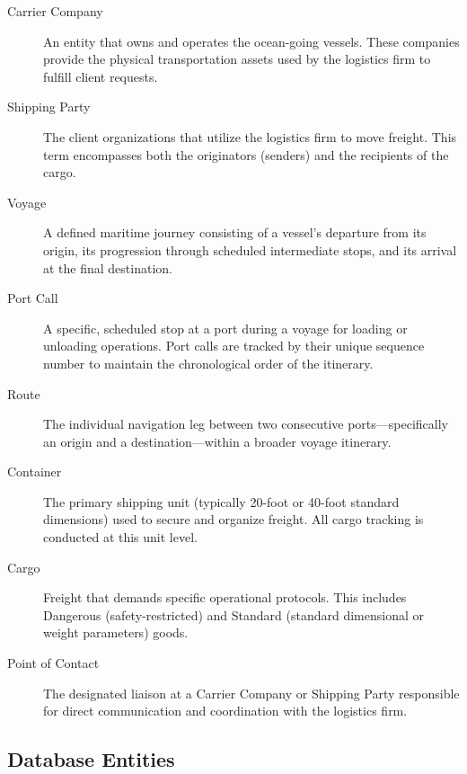 \documentclass[11pt]{article}
\begin{document}
\begin{description}
    \item[Carrier Company] An entity that owns and operates the ocean-going vessels. These companies provide the physical transportation assets used by the logistics firm to fulfill client requests.
    
    \item[Shipping Party] The client organizations that utilize the logistics firm to move freight. This term encompasses both the originators (senders) and the recipients of the cargo.
    
    \item[Voyage] A defined maritime journey consisting of a vessel's departure from its origin, its progression through scheduled intermediate stops, and its arrival at the final destination.
    
    \item[Port Call] A specific, scheduled stop at a port during a voyage for loading or unloading operations. Port calls are tracked by their unique sequence number to maintain the chronological order of the itinerary.
    
    \item[Route] The individual navigation leg between two consecutive ports—specifically an origin and a destination—within a broader voyage itinerary.
    
    \item[Container] The primary shipping unit (typically 20-foot or 40-foot standard dimensions) used to secure and organize freight. All cargo tracking is conducted at this unit level.
    
    \item[Cargo] Freight that demands specific operational protocols. This includes Dangerous (safety-restricted) and Standard (standard dimensional or weight parameters) goods.
    
    \item[Point of Contact] The designated liaison at a Carrier Company or Shipping Party responsible for direct communication and coordination with the logistics firm.
\end{description}

\subsection{Database Entities}
\end{document}
